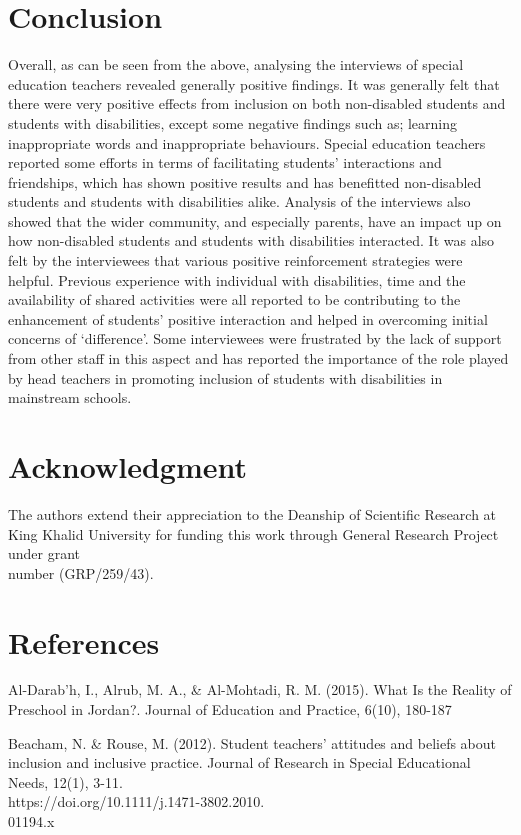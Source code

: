 \documentclass[11pt]{sig-alternate}
\begin{document}
\begin{large}
{\section*{Conclusion}
Overall, as can be seen from the above, analysing the interviews of special education teachers revealed generally positive findings. It was generally felt that there were very positive effects from inclusion on both non-disabled students and students with disabilities, except some negative findings such as; learning inappropriate words and inappropriate behaviours. Special education teachers reported some efforts in terms of facilitating students’ interactions and friendships, which has shown positive results and has benefitted non-disabled students and students with disabilities alike. Analysis of the interviews also showed that the wider community, and especially parents, have an impact up on how non-disabled students and students with disabilities interacted. It was also felt by the interviewees that various positive reinforcement strategies were helpful. Previous experience with individual with disabilities, time and the availability of shared activities were all reported to be contributing to the enhancement of students’ positive interaction and helped in overcoming initial concerns of ‘difference’. Some interviewees were frustrated by the lack of support from other staff in this aspect and has reported the importance of the role played by head teachers in promoting inclusion of students with disabilities in mainstream schools.

\section*{Acknowledgment}
The authors extend their appreciation to the Deanship of Scientific Research at King Khalid University for funding this work through General Research Project under grant \\number (GRP/259/43).

 
\section*{References}\par 

\leftskip 0.25in
\parindent -0.25in 

Al-Darab'h, I., Alrub, M. A., \& Al-Mohtadi, R. M. (2015). What Is the Reality of Preschool in Jordan?. Journal of Education and Practice, 6(10), 180-187

Beacham, N. \& Rouse, M. (2012). Student teachers' attitudes and beliefs about inclusion and inclusive practice. Journal of Research in Special Educational Needs, 12(1), 3-11.‏ \\https://doi.org/10.1111/j.1471-3802.2010.\\01194.x

}
\end{large}
\end{document}
